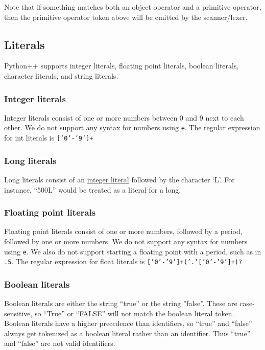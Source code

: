 \documentclass{article}
\begin{document}
Note that if something matches both an object operator and a primitive operator, then the primitive operator token above will be emitted by the scanner/lexer.

\subsection{Literals}
Python++ supports integer literals, floating point literals, boolean literals, character literals, and string literals.

\subsubsection{Integer literals}
\label{sec:intliterals}
Integer literals consist of one or more numbers between 0 and 9 next to each other. We do not support any syntax for numbers using \texttt{e}. The regular expression for int literals is \texttt{['0'-'9']+}

\subsubsection{Long literals}
\label{sec:longliterals}
Long literals consist of an \hyperref[sec:intliterals]{integer literal} followed by the character `L'. For instance, ``500L'' would be treated as a literal for a long.

\subsubsection{Floating point literals}
Floating point literals consist of one or more numbers, followed by a period, followed by one or more numbers. We do not support any syntax for numbers using \texttt{e}. We also do not support starting a floating point with a period, such as in \texttt{.5}. The regular expression for float literals is \texttt{['0'-'9']+('.'['0'-'9']+)?}

\subsubsection{Boolean literals}
Boolean literals are either the string ``true'' or the string ''false''. These are case-sensitive, so ``True'' or ``FALSE'' will not match the boolean literal token. Boolean literals have a higher precedence than identifiers, so ``true'' and ``false'' always get tokenized as a boolean literal rather than an identifier. Thus ``true'' and ``false'' are not valid identifiers.
\end{document}
